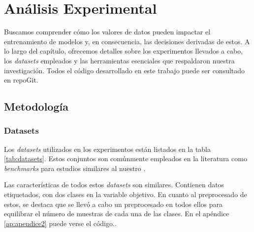 \chapter{Análisis Experimental}



Buscamos comprender cómo los valores de datos pueden impactar el
entrenamiento de modelos y, en consecuencia, las
decisiones derivadas de estos. A lo largo del capítulo,
ofrecemos detalles sobre los experimentos llevados a cabo,
los \textit{datasets} empleados y las herramientas
esenciales que respaldaron nuestra investigación.
Todos el código desarrollado en este trabajo puede
ser consultado en repoGit.

\newpage

\section{Metodología}
\subsection{Datasets}

Los \textit{datasets} utilizados en los experimentos están
listados en la tabla \ref{tab:datasets}. Estos conjuntos
son comúnmente empleados en la literatura como
\textit{benchmarks} para estudios similares al nuestro
\cite{dataBanzhaf}.

Las características de todos estos \textit{datasets} son
similares. Contienen datos etiquetados, con dos clases
en la variable objetivo. En cuanto al preprocesado de estos,
se destaca que se llevó a cabo un
preprocesado en todos ellos para equilibrar
el número de muestras de cada una de las clases.
En el apéndice \ref{ap:apendice2} puede verse el código..


